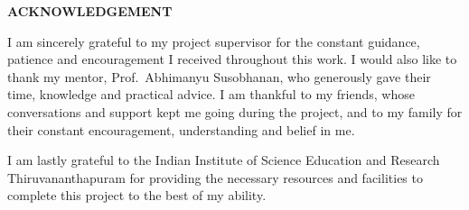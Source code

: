 \begin{center}
{\Large{\bf{ACKNOWLEDGEMENT}}}
\end{center}


\noindent
I am sincerely grateful to my project supervisor for the constant guidance,
patience and encouragement I received throughout this work. I would also like
to thank my mentor, Prof.\ Abhimanyu Susobhanan, who generously gave their time,
knowledge and practical advice. I am thankful to my friends, whose
conversations and support kept me going during the project, and to my family
for their constant encouragement, understanding and belief in me.
\par
I am lastly grateful to the Indian Institute of Science Education and Research Thiruvananthapuram for providing the necessary resources and facilities to complete this project to the best of my ability.

\clearpage
